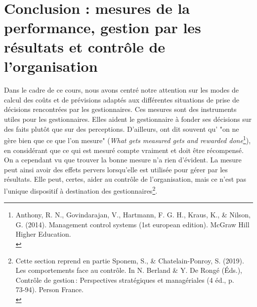 \documentclass{tufte-handout}
\begin{document}
\clearpage\\
\section{Conclusion : mesures de la performance, gestion par les résultats et contrôle de l'organisation}
\label{sec:orgc45fa0b}
Dans le cadre de ce cours, nous avons centré notre attention sur les modes de calcul des coûts et de prévisions adaptés aux différentes situations de prise de décisions rencontrées par les gestionnaires. Ces mesures sont des instruments utiles pour les gestionnaires. Elles aident le gestionnaire à fonder ses décisions sur des faits plutôt que sur des perceptions. D'ailleurs, ont dit souvent qu' "on ne gère bien que ce que l'on mesure" (\emph{What gets measured gets and rewarded done}\footnote{Anthony, R. N., Govindarajan, V., Hartmann, F. G. H., Kraus, K., \& Nilson, G. (2014). Management control systems (1st european edition). McGraw Hill Higher Education.\\}), en considérant que ce qui est mesuré compte vraiment et doit être récompensé.\\

On a cependant vu que trouver la bonne mesure n'a rien d’évident. La mesure peut ainsi avoir des effets pervers lorsqu'elle est utilisée pour gérer par les résultats. Elle peut, certes, aider au contrôle de l'organisation, mais ce n'est pas l'unique dispositif à destination des gestionnaires\footnote{Cette section reprend en partie Sponem, S., \& Chatelain-Ponroy, S. (2019). Les comportements face au contrôle. In N. Berland \& Y. De Rongé (Éds.), Contrôle de gestion : Perspectives stratégiques et managériales (4 éd., p. 73‑94). Person France.\\}.\\
\end{document}
